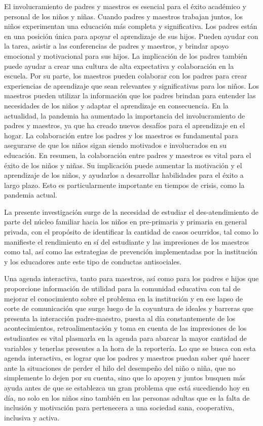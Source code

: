 El involucramiento de padres y maestros es esencial para el éxito académico y personal
de los niños y niñas. Cuando padres y maestros trabajan juntos, los niños experimentan una
educación más completa y significativa.
Los padres están en una posición única para apoyar el aprendizaje de sus hijos. Pueden
ayudar con la tarea, asistir a las conferencias de padres y maestros, y brindar apoyo emocional y
motivacional para sus hijos. La implicación de los padres también puede ayudar a crear una
cultura de alta expectativa y colaboración en la escuela.
Por su parte, los maestros pueden colaborar con los padres para crear experiencias de
aprendizaje que sean relevantes y significativas para los niños. Los maestros pueden utilizar la
información que los padres brindan para entender las necesidades de los niños y adaptar el
aprendizaje en consecuencia.
En la actualidad, la pandemia ha aumentado la importancia del involucramiento de padres
y maestros, ya que ha creado nuevos desafíos para el aprendizaje en el hogar. La colaboración
entre los padres y los maestros es fundamental para asegurarse de que los niños sigan siendo
motivados e involucrados en su educación.
En resumen, la colaboración entre padres y maestros es vital para el éxito de los niños y
niñas. Su implicación puede aumentar la motivación y el aprendizaje de los niños, y ayudarlos a
desarrollar habilidades para el éxito a largo plazo. Esto es particularmente importante en tiempos
de crisis, como la pandemia actual.

La presente investigación surge de la necesidad de estudiar el des-atendimiento de parte
del núcleo familiar hacia los niños en pre-primaria y primaria en general privada, con el
propósito de identificar la cantidad de casos ocurridos, tal como lo manifieste el rendimiento en
sí del estudiante y las impresiones de los maestros como tal, así como las estrategias de
prevención implementadas por la institución y los educadores ante este tipo de conductas
antisociales.

Una agenda interactiva, tanto para maestros, así como para los padres e hijos que
proporcione información de utilidad para la comunidad educativa con tal de mejorar el
conocimiento sobre el problema en la institución y en ese lapso de corte de comunicación que
surge luego de la coyuntura de ideales y barreras que presenta la interacción padre-maestro,
puesta al día constantemente de los acontecimientos, retroalimentación y toma en cuenta de las
impresiones de los estudiantes es vital plasmarla en la agenda para abarcar la mayor cantidad de
variables y tenerlas presentes a la hora de la reportería.
Lo que se busca con esta agenda interactiva, es lograr que los padres y maestros puedan
saber qué hacer ante la situaciones de perder el hilo del desempeño del niño o niña, que no
simplemente lo dejen por su cuenta, sino que lo apoyen y juntos busquen más ayuda antes de que
se establezca un gran problema que está sucediendo hoy en día, no solo en los niños sino también
en las personas adultas que es la falta de inclusión y motivación para pertenecera a una sociedad
sana, cooperativa, inclusiva y activa.

